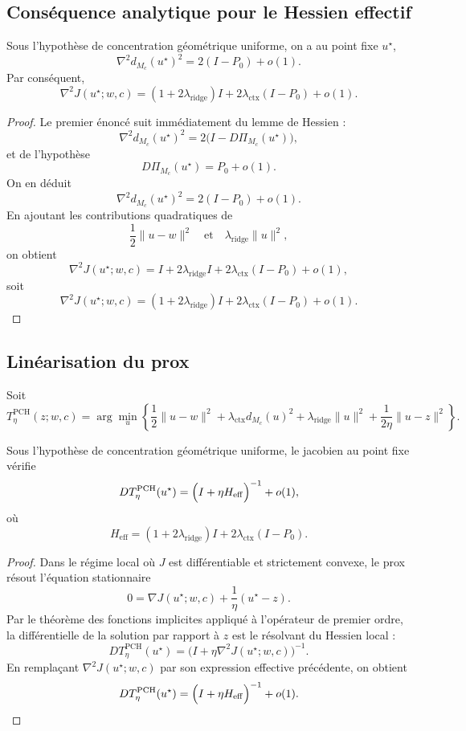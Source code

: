 \subsection{Conséquence analytique pour le Hessien effectif}

\begin{proposition}
Sous l'hypothèse de concentration géométrique uniforme, on a au point fixe \(u^\star\),
\[
\nabla^2 d_{M_c}(u^\star)^2
=
2(I-P_0)+o(1).
\]
Par conséquent,
\[
\nabla^2 J(u^\star;w,c)
=
(1+2\lambda_{\mathrm{ridge}})I
+
2\lambda_{\mathrm{ctx}}(I-P_0)
+
o(1).
\]
\end{proposition}

\begin{proof}
Le premier énoncé suit immédiatement du lemme de Hessien :
\[
\nabla^2 d_{M_c}(u^\star)^2
=
2\bigl(I-D\Pi_{M_c}(u^\star)\bigr),
\]
et de l'hypothèse
\[
D\Pi_{M_c}(u^\star)=P_0+o(1).
\]
On en déduit
\[
\nabla^2 d_{M_c}(u^\star)^2
=
2(I-P_0)+o(1).
\]
En ajoutant les contributions quadratiques de
\[
\frac12\|u-w\|^2
\quad\text{et}\quad
\lambda_{\mathrm{ridge}}\|u\|^2,
\]
on obtient
\[
\nabla^2 J(u^\star;w,c)
=
I+2\lambda_{\mathrm{ridge}}I
+2\lambda_{\mathrm{ctx}}(I-P_0)
+o(1),
\]
soit
\[
\nabla^2 J(u^\star;w,c)
=
(1+2\lambda_{\mathrm{ridge}})I
+
2\lambda_{\mathrm{ctx}}(I-P_0)
+
o(1).
\]
\end{proof}

\subsection{Linéarisation du prox}

Soit
\[
T_\eta^{\mathrm{PCH}}(z;w,c)
=
\arg\min_u
\left\{
\frac12\|u-w\|^2
+
\lambda_{\mathrm{ctx}} d_{M_c}(u)^2
+
\lambda_{\mathrm{ridge}}\|u\|^2
+
\frac{1}{2\eta}\|u-z\|^2
\right\}.
\]

\begin{theorem}
Sous l'hypothèse de concentration géométrique uniforme, le jacobien au point fixe vérifie
\[
DT_\eta^{\mathrm{PCH}}(u^\star)
=
\Bigl(I+\eta H_{\mathrm{eff}}\Bigr)^{-1}
+
o(1),
\]
où
\[
H_{\mathrm{eff}}
=
(1+2\lambda_{\mathrm{ridge}})I
+
2\lambda_{\mathrm{ctx}}(I-P_0).
\]
\end{theorem}

\begin{proof}
Dans le régime local où \(J\) est différentiable et strictement convexe, le prox résout l'équation stationnaire
\[
0
=
\nabla J(u^\star;w,c)+\frac1\eta(u^\star-z).
\]
Par le théorème des fonctions implicites appliqué à l'opérateur de premier ordre, la différentielle de la solution par rapport à \(z\) est le résolvant du Hessien local :
\[
DT_\eta^{\mathrm{PCH}}(u^\star)
=
\bigl(I+\eta \nabla^2 J(u^\star;w,c)\bigr)^{-1}.
\]
En remplaçant \(\nabla^2 J(u^\star;w,c)\) par son expression effective précédente, on obtient
\[
DT_\eta^{\mathrm{PCH}}(u^\star)
=
\Bigl(I+\eta H_{\mathrm{eff}}\Bigr)^{-1}
+
o(1).
\]
\end{proof}

